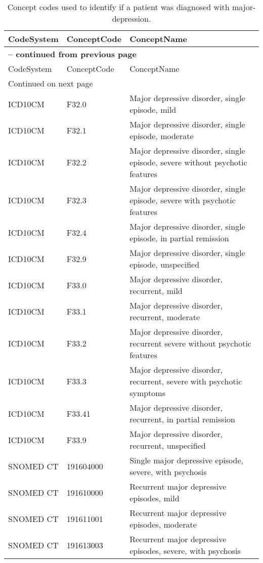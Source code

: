 \begin{longtable}{p{}p{}p{}}
\caption{Concept codes used to identify if a patient was diagnosed with major-depression.} \\ 
 CodeSystem & ConceptCode & ConceptName \\ 
  \hline 
\endfirsthead 
\multicolumn{3}{p{\textwidth}}{{ \bfseries \tablename \thetable{} -- continued from previous page}} \\ 
\hline CodeSystem & ConceptCode & ConceptName \\ \hline 
\endhead 
\hline \multicolumn{3}{p{\textwidth}}{{Continued on next page}} \\ \hline 
\endfoot 
\hline 
\endlastfoot 
 \hline
ICD10CM & F32.0 & Major depressive disorder, single episode, mild \\ 
  ICD10CM & F32.1 & Major depressive disorder, single episode, moderate \\ 
  ICD10CM & F32.2 & Major depressive disorder, single episode, severe without psychotic features \\ 
  ICD10CM & F32.3 & Major depressive disorder, single episode, severe with psychotic features \\ 
  ICD10CM & F32.4 & Major depressive disorder, single episode, in partial remission \\ 
  ICD10CM & F32.9 & Major depressive disorder, single episode, unspecified \\ 
  ICD10CM & F33.0 & Major depressive disorder, recurrent, mild \\ 
  ICD10CM & F33.1 & Major depressive disorder, recurrent, moderate \\ 
  ICD10CM & F33.2 & Major depressive disorder, recurrent severe without psychotic features \\ 
  ICD10CM & F33.3 & Major depressive disorder, recurrent, severe with psychotic symptoms \\ 
  ICD10CM & F33.41 & Major depressive disorder, recurrent, in partial remission \\ 
  ICD10CM & F33.9 & Major depressive disorder, recurrent, unspecified \\ 
  SNOMED CT & 191604000 & Single major depressive episode, severe, with psychosis \\ 
  SNOMED CT & 191610000 & Recurrent major depressive episodes, mild \\ 
  SNOMED CT & 191611001 & Recurrent major depressive episodes, moderate \\ 
  SNOMED CT & 191613003 & Recurrent major depressive episodes, severe, with psychosis \\ 

\end{longtable}
